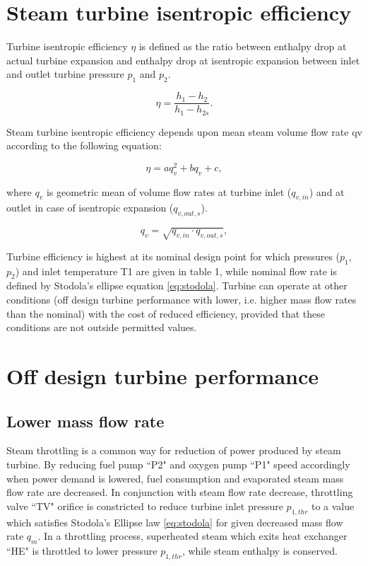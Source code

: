 \documentclass{article}
\begin{document}
	\section{Steam turbine isentropic efficiency}
	
	Turbine isentropic efficiency $\eta$ is defined as the ratio between enthalpy drop at actual turbine expansion and enthalpy drop at isentropic expansion between inlet and outlet turbine pressure $p_1$ and $p_2$.
	
	\begin{equation}\label{eq:eta}
		\eta = \frac{h_1-h_2}{h_1 - h_{2s}}.
	\end{equation}
	
	Steam turbine isentropic efficiency depends upon mean steam volume flow rate qv according to the following equation:
	
	\begin{equation}\label{eq:eta2}
		\eta = aq_v^2 + bq_v + c,
	\end{equation}
	
	\noindent
	where $q_v$ is geometric mean of volume flow rates at turbine inlet ($q_{v,in}$) and at outlet in case of isentropic expansion ($q_{v,out,s}$). 
	
	\begin{equation}\label{eq:q_v}
		q_v = \sqrt{q_{v,in} \cdot q_{v,out,s}},
	\end{equation}
	
	Turbine efficiency is highest at its nominal design point for which pressures ($p_1$, $p_2$) and inlet temperature T1 are given in table 1, while nominal flow rate is defined by Stodola’s ellipse equation \ref{eq:stodola}. Turbine can operate at other conditions (off design turbine performance with lower, i.e. higher mass flow rates than the nominal) with the cost of reduced efficiency, provided that these conditions are not outside permitted values.
	
	\section{Off design turbine performance}
	
	\subsection*{Lower mass flow rate}
	
	Steam throttling is a common way for reduction of power produced by steam turbine. By reducing fuel pump “P2" and oxygen pump “P1" speed accordingly when power demand is lowered, fuel consumption and evaporated steam mass flow rate are decreased. In conjunction with steam flow rate decrease, throttling valve “TV" orifice is constricted to reduce turbine inlet pressure $p_{1,thr}$ to a value which satisfies Stodola’s Ellipse law \ref{eq:stodola} for given decreased mass flow rate $q_m$. In a throttling process, superheated steam which exits heat exchanger “HE" is throttled to lower pressure $p_{1,thr}$, while steam enthalpy is conserved.
	
\end{document}
